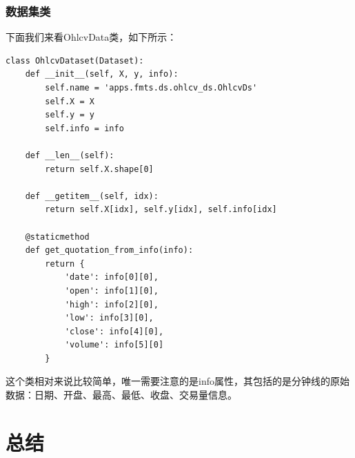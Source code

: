 \subsubsection{数据集类}
下面我们来看OhlcvData类，如下所示：
\begin{lstlisting}
class OhlcvDataset(Dataset):
    def __init__(self, X, y, info):
        self.name = 'apps.fmts.ds.ohlcv_ds.OhlcvDs'
        self.X = X
        self.y = y
        self.info = info

    def __len__(self):
        return self.X.shape[0]

    def __getitem__(self, idx):
        return self.X[idx], self.y[idx], self.info[idx]

    @staticmethod
    def get_quotation_from_info(info):
        return {
            'date': info[0][0], 
            'open': info[1][0], 
            'high': info[2][0], 
            'low': info[3][0], 
            'close': info[4][0], 
            'volume': info[5][0]
        }
\end{lstlisting}
这个类相对来说比较简单，唯一需要注意的是info属性，其包括的是分钟线的原始数据：日期、开盘、最高、最低、收盘、交易量信息。

\section{总结}